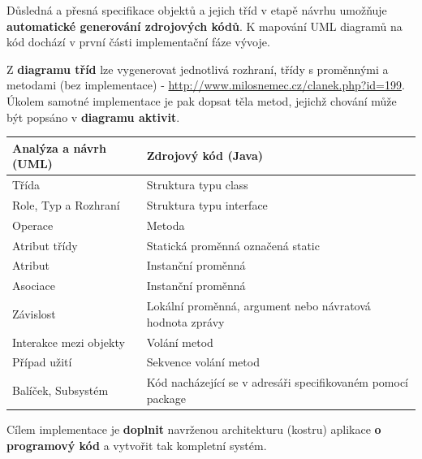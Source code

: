 Důsledná a přesná specifikace {objektů} a jejich {tříd} v etapě návrhu umožňuje\textbf{ automatické generování zdrojových kódů}. K mapování UML diagramů na kód dochází v první části implementační fáze vývoje.

Z \textbf{diagramu tříd} lze vygenerovat jednotlivá rozhraní, třídy s proměnnými a metodami (bez implementace) - \url{http://www.milosnemec.cz/clanek.php?id=199}. Úkolem samotné implementace je pak dopsat těla metod, jejichž chování může být popsáno v \textbf{diagramu aktivit}.

\begin{table}[H]
	\centering
	\begin{tabular}{|l|l|}
		\hline
		\textbf{Analýza a návrh (UML)} & \textbf{Zdrojový kód (Java)}                                \\ \hline
		Třída                          & Struktura typu class                                        \\ \hline
		Role, Typ a Rozhraní           & Struktura typu interface                                    \\ \hline
		Operace                        & Metoda                                                      \\ \hline
		Atribut třídy                  & Statická proměnná označená static                           \\ \hline
		Atribut                        & Instanční proměnná                                          \\ \hline
		Asociace                       & Instanční proměnná                                          \\ \hline
		Závislost                      & Lokální proměnná, argument nebo návratová hodnota zprávy    \\ \hline
		Interakce mezi objekty         & Volání metod                                                \\ \hline
		Případ užití                   & Sekvence volání metod                                       \\ \hline
		Balíček, Subsystém             & Kód nacházející se v adresáři specifikovaném pomocí package \\ \hline
	\end{tabular}
\end{table}

Cílem implementace je \textbf{doplnit} navrženou architekturu (kostru) aplikace \textbf{o programový kód} a vytvořit tak kompletní systém.

